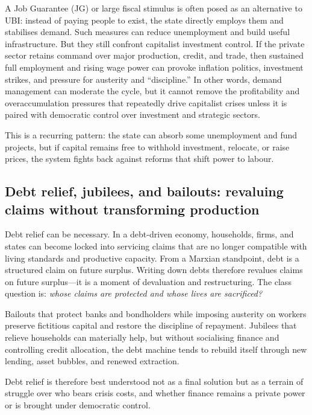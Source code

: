 A Job Guarantee (JG) or large fiscal stimulus is often posed as an alternative to UBI: instead of paying people to exist,
the state directly employs them and stabilises demand. Such measures can reduce unemployment and build useful infrastructure.
But they still confront capitalist investment control. If the private sector retains command over major production, credit,
and trade, then sustained full employment and rising wage power can provoke inflation politics, investment strikes, and
pressure for austerity and ``discipline.'' In other words, demand management can moderate the cycle, but it cannot remove
the profitability and overaccumulation pressures that repeatedly drive capitalist crises unless it is paired with democratic
control over investment and strategic sectors.

This is a recurring pattern: the state can absorb some unemployment and fund projects, but if capital remains free to
withhold investment, relocate, or raise prices, the system fights back against reforms that shift power to labour.

\subsection{Debt relief, jubilees, and bailouts: revaluing claims without transforming production}
\label{sec:policy-debt-relief}

Debt relief can be necessary. In a debt-driven economy, households, firms, and states can become locked into servicing
claims that are no longer compatible with living standards and productive capacity. From a Marxian standpoint, debt is a
structured claim on future surplus. Writing down debts therefore revalues claims on future surplus---it is a moment of
devaluation and restructuring. The class question is: \emph{whose claims are protected and whose lives are sacrificed?}

Bailouts that protect banks and bondholders while imposing austerity on workers preserve fictitious capital and restore the
discipline of repayment. Jubilees that relieve households can materially help, but without socialising finance and controlling
credit allocation, the debt machine tends to rebuild itself through new lending, asset bubbles, and renewed extraction.

Debt relief is therefore best understood not as a final solution but as a terrain of struggle over who bears crisis costs,
and whether finance remains a private power or is brought under democratic control.

